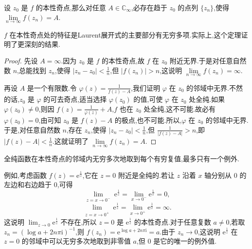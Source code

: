 \documentclass[../../main.tex]{subfiles}
\begin{document}
\begin{theorem}[Weierstrass定理]\label{theorem:Weierstrass-定理5.2.5}
设 \( z_0 \) 是 \( f \) 的本性奇点,那么对任意 \( A \in \mathbb{C}_{\infty} \),必存在趋于 \( z_0 \) 的点列 \( \{ z_n \} \),使得 \( \lim\limits_{n \to \infty} f(z_n) = A \).
\end{theorem}
\begin{remark}
\( f \) 在本性奇点处的特征是Laurent展开式的主要部分有无穷多项.实际上,这个定理证明了更深刻的结果.
\end{remark}
\begin{proof}
先设 \( A = \infty \).因为 \( z_0 \) 是 \( f \) 的本性奇点,故 \( f \) 在 \( z_0 \) 附近无界.于是对任意自然数 \( n \),总能找到 \( z_n \),使得 \( |z_n - z_0| < \frac{1}{n} \),但 \( |f(z_n)| > n \),这说明 \( \lim\limits_{n \to \infty} f(z_n) = \infty \).

再设 \( A \) 是一个有限数.令 \( \varphi(z) = \frac{1}{f(z) - A} \),我们证明 \( \varphi \) 在 \( z_0 \) 的邻域中无界.不然的话,\( z_0 \) 是 \( \varphi \) 的可去奇点,适当选择 \( \varphi(z_0) \) 的值,可使 \( \varphi \) 在 \( z_0 \) 处全纯.如果 \( \varphi(z_0) \neq 0 \),则因 \( f(z) = \frac{1}{\varphi(z)} + A \),\( f \) 也在 \( z_0 \) 处全纯,这不可能.故必有 \( \varphi(z_0) = 0 \),由可知 \( z_0 \) 是 \( f(z) -A\) 的极点,也不可能.所以,\( \varphi \) 在 \( z_0 \) 的邻域中无界.于是,对任意自然数 \( n \),存在 \( z_n \),使得 \( |z_n - z_0| < \frac{1}{n} \),但 \( \frac{1}{|f(z) - A|} > n \),即 \( |f(z) - A| < \frac{1}{n} \).这就证明了 \( \lim\limits_{n \to \infty} f(z_n) = A \).

\end{proof}

\begin{theorem}[Picard定理]\label{ theorem:Picard定理-定理5.2.6}
全纯函数在本性奇点的邻域内无穷多次地取到每个有穷复值,最多只有一个例外.
\end{theorem}
\begin{remark}
例如,考虑函数 \( f(z) = \mathrm{e}^{\frac{1}{z}} \),它在 \( z = 0 \) 附近是全纯的.若让 \( z \) 沿着 \( x \) 轴分别从 \( 0 \) 的左边和右边趋于 \( 0 \),可得
\[
\lim_{\substack{z = x \to 0^-}} \mathrm{e}^{\frac{1}{z}} = \lim_{x \to 0^-} \mathrm{e}^{\frac{1}{x}} = 0,
\]
\[
\lim_{\substack{z = x \to 0^+}} \mathrm{e}^{\frac{1}{z}} = \lim_{x \to 0^+} \mathrm{e}^{\frac{1}{x}} = \infty.
\]
这说明 \( \lim_{z \to 0} \mathrm{e}^{\frac{1}{z}} \) 不存在,所以 \( z = 0 \) 是 \( \mathrm{e}^{\frac{1}{z}} \) 的本性奇点.对于任意复数 \( a \neq 0 \),若取 \( z_n = (\log a + 2n\pi \mathrm{i})^{-1} \),则 \( f(z_n) = \mathrm{e}^{\log a + 2n\pi \mathrm{i}} = a \).由于 \( z_n \to 0 \),这说明 \( \mathrm{e}^{\frac{1}{z}} \) 在 \( z = 0 \) 的邻域中可以无穷多次地取到非零值 \( a \),但 \( 0 \) 是它的唯一的例外值.
\end{remark}
\end{document}

